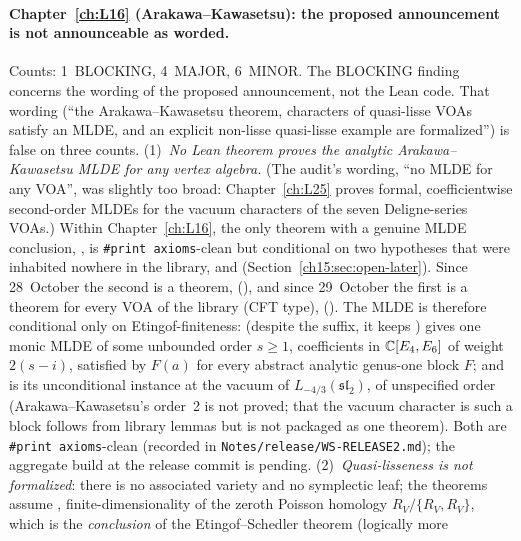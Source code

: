 \paragraph{Chapter~\ref{ch:L16} (Arakawa--Kawasetsu): the proposed announcement is not announceable as worded.} Counts:
1~BLOCKING, 4~MAJOR, 6~MINOR. The BLOCKING finding concerns the wording of the proposed announcement, not the Lean code.
That wording (``the Arakawa--Kawasetsu theorem, characters of quasi-lisse VOAs satisfy an MLDE, and an explicit
non-lisse quasi-lisse example are formalized'') is false on three counts. (1)~\emph{No Lean theorem proves the analytic Arakawa--Kawasetsu
MLDE for any vertex algebra.} (The audit's wording, ``no MLDE for any VOA'', was slightly too broad: Chapter~\ref{ch:L25}
proves formal, coefficientwise second-order MLDEs for the vacuum characters of the seven Deligne-series VOAs.) Within
Chapter~\ref{ch:L16}, the only theorem with a genuine MLDE conclusion,
, is \texttt{\#print axioms}-clean but
conditional on two hypotheses that were inhabited nowhere in the library,  and
 (Section~\ref{ch15:sec:open-later}). Since 28~October the second is a theorem,
 (), and since 29~October the first is a theorem for every
VOA of the library (CFT type),  (). The MLDE is
therefore conditional only on Etingof-finiteness:
 (despite the suffix, it keeps
) gives one monic MLDE of some unbounded order $s\ge1$, coefficients in ${\mathbb{C}}[E_4,E_6]$ of weight
$2(s-i)$, satisfied by $F(a)$ for every abstract analytic genus-one block $F$; and
 is its unconditional instance at the vacuum of
$L_{-4/3}(\mathfrak{sl}_2)$, of unspecified order (Arakawa--Kawasetsu's order~2 is not proved; that the vacuum character
is such a block follows from library lemmas but is not packaged as one theorem). Both are \texttt{\#print axioms}-clean
(recorded in \texttt{Notes/release/WS-RELEASE2.md}); the aggregate build at the release commit is pending. (2)~\emph{Quasi-lisseness is not formalized}: there is no
associated variety and no symplectic leaf; the theorems assume , finite-dimensionality of the zeroth
Poisson homology $R_V/\{R_V,R_V\}$, which is the \emph{conclusion} of the Etingof--Schedler theorem (logically more
